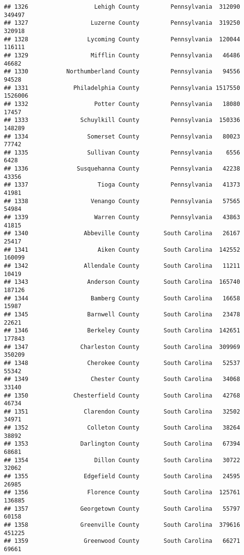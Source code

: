 \documentclass[
]{article}
\begin{document}
\begin{verbatim}
## 1326                   Lehigh County         Pennsylvania  312090  349497
## 1327                  Luzerne County         Pennsylvania  319250  320918
## 1328                 Lycoming County         Pennsylvania  120044  116111
## 1329                  Mifflin County         Pennsylvania   46486   46682
## 1330           Northumberland County         Pennsylvania   94556   94528
## 1331             Philadelphia County         Pennsylvania 1517550 1526006
## 1332                   Potter County         Pennsylvania   18080   17457
## 1333               Schuylkill County         Pennsylvania  150336  148289
## 1334                 Somerset County         Pennsylvania   80023   77742
## 1335                 Sullivan County         Pennsylvania    6556    6428
## 1336              Susquehanna County         Pennsylvania   42238   43356
## 1337                    Tioga County         Pennsylvania   41373   41981
## 1338                  Venango County         Pennsylvania   57565   54984
## 1339                   Warren County         Pennsylvania   43863   41815
## 1340                Abbeville County       South Carolina   26167   25417
## 1341                    Aiken County       South Carolina  142552  160099
## 1342                Allendale County       South Carolina   11211   10419
## 1343                 Anderson County       South Carolina  165740  187126
## 1344                  Bamberg County       South Carolina   16658   15987
## 1345                 Barnwell County       South Carolina   23478   22621
## 1346                 Berkeley County       South Carolina  142651  177843
## 1347               Charleston County       South Carolina  309969  350209
## 1348                 Cherokee County       South Carolina   52537   55342
## 1349                  Chester County       South Carolina   34068   33140
## 1350             Chesterfield County       South Carolina   42768   46734
## 1351                Clarendon County       South Carolina   32502   34971
## 1352                 Colleton County       South Carolina   38264   38892
## 1353               Darlington County       South Carolina   67394   68681
## 1354                   Dillon County       South Carolina   30722   32062
## 1355                Edgefield County       South Carolina   24595   26985
## 1356                 Florence County       South Carolina  125761  136885
## 1357               Georgetown County       South Carolina   55797   60158
## 1358               Greenville County       South Carolina  379616  451225
## 1359                Greenwood County       South Carolina   66271   69661

\end{verbatim}
\end{document}
